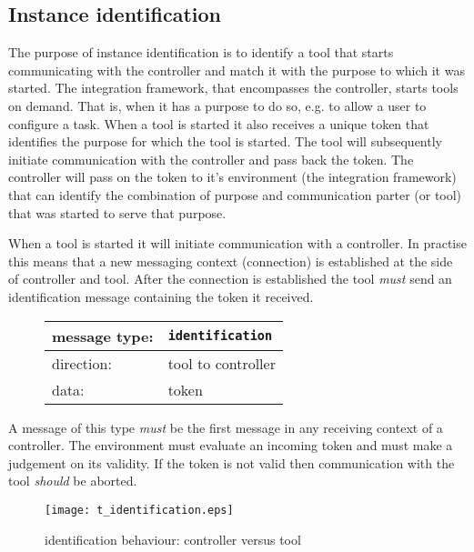 \documentclass{article}
\newcommand{\msg}[1]{\texttt{#1}}
\begin{document}
  \subsection{Instance identification} \label{s:instance_identification}

   The purpose of instance identification is to identify a tool that starts
   communicating with the controller and match it with the purpose to which it
   was started.  The integration framework, that encompasses the controller,
   starts tools on demand. That is, when it has a purpose to do so, e.g. to
   allow a user to configure a task. When a tool is started it also receives
   a unique token that identifies the purpose for which the tool is started.
   The tool will subsequently initiate communication with the controller and pass
   back the token. The controller will pass on the token to it's environment
   (the integration framework) that can identify the combination of purpose and
   communication parter (or tool) that was started to serve that purpose.
   
   When a tool is started it will initiate communication with a controller.  In
   practise this means that a new messaging context (connection) is established
   at the side of controller and tool.  After the connection is established the
   tool \emph{must} send an identification message containing the token it
   received.
   
   \begin{figure}[H]
    \begin{center}
     \begin{tabular}{|ll|}
      \hline
      message type:    & \msg{identification} \\
      \hline
      direction:       & tool to controller \\
      data:            & token \\
      \hline
     \end{tabular}
    \end{center}
   \end{figure}

   \noindent A message of this type \emph{must} be the first message in any
   receiving context of a controller. The environment must evaluate an incoming
   token and must make a judgement on its validity. If the token is not valid
   then communication with the tool \emph{should} be aborted.

   \begin{figure}[H]
    \begin{center}
     \texttt{[image: t\_identification.eps]}
    \end{center}
    \vspace{-0.3cm}
    \caption{identification behaviour: controller versus tool}
   \end{figure}
\end{document}

